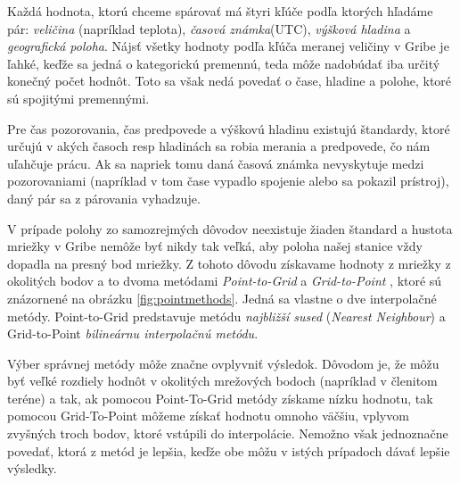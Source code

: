 Každá hodnota, ktorú chceme spárovať má štyri kľúče podľa ktorých hľadáme pár: \textit{veličina} (napríklad teplota), \textit{časová známka}(UTC), \textit{výšková hladina} a \textit{geografická poloha}.
Nájsť všetky hodnoty podľa kľúča meranej veličiny v Gribe je ľahké, keďže sa jedná o kategorickú premennú, teda môže nadobúdať iba určitý konečný počet hodnôt. Toto sa však nedá povedať o čase, hladine a polohe, ktoré sú spojitými premennými.
 
Pre čas pozorovania, čas predpovede a výškovú hladinu existujú štandardy, ktoré určujú v akých časoch resp hladinách sa robia merania a predpovede, čo nám uľahčuje prácu. Ak sa napriek tomu daná časová známka nevyskytuje medzi pozorovaniami (napríklad v tom čase vypadlo spojenie alebo sa pokazil prístroj), daný pár sa z párovania vyhadzuje.

V prípade polohy zo samozrejmých dôvodov neexistuje žiaden štandard a hustota mriežky v Gribe nemôže byť nikdy tak veľká, aby poloha našej stanice vždy dopadla na presný bod mriežky. Z tohoto dôvodu získavame hodnoty z mriežky z okolitých bodov a to dvoma metódami \textit{Point-to-Grid} a \textit{Grid-to-Point} \cite{IntroToVerif}, ktoré sú znázornené na obrázku \ref{fig:pointmethods}. Jedná sa vlastne o dve interpolačné metódy. Point-to-Grid predstavuje metódu \textit{najbližší sused} (\textit{Nearest Neighbour}) a Grid-to-Point \textit{bilineárnu interpolačnú metódu}. 

Výber správnej metódy môže značne ovplyvniť výsledok. Dôvodom je, že môžu byť veľké rozdiely hodnôt v okolitých mrežových bodoch (napríklad v členitom teréne) a tak, ak pomocou Point-To-Grid metódy získame nízku hodnotu, tak pomocou Grid-To-Point môžeme získať hodnotu omnoho väčšiu, vplyvom zvyšných troch bodov, ktoré vstúpili do interpolácie. Nemožno však jednoznačne povedať, ktorá z metód je lepšia, keďže obe môžu v istých prípadoch dávať lepšie výsledky. 

